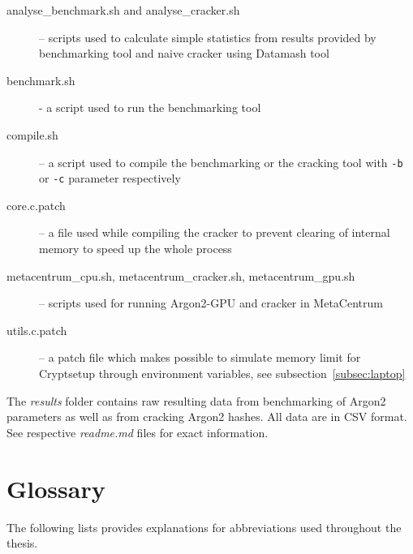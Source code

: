 \documentclass[nolof,digital]{fithesis3}
\begin{document}
\begin{description}
\item[analyse\_benchmark.sh and analyse\_cracker.sh] -- scripts used to calculate simple statistics from results provided by benchmarking tool and naive cracker using Datamash tool

\item[benchmark.sh]  - a script used to run the benchmarking tool

\item[compile.sh] -- a script used to compile the benchmarking or the cracking tool with \verb+-b+ or \verb+-c+ parameter respectively

\item[core.c.patch] -- a file used while compiling the cracker to prevent clearing of internal memory to speed up the whole process

\item[metacentrum\_cpu.sh, metacentrum\_cracker.sh, metacentrum\_gpu.sh] -- scripts used for running Argon2-GPU and cracker in MetaCentrum

\item[utils.c.patch] -- a patch file which makes possible to simulate memory limit for Cryptsetup through environment variables, see subsection~\ref{subsec:laptop}
\end{description}

The \emph{results} folder contains raw resulting data from benchmarking of Argon2 parameters as well as from cracking Argon2 hashes. All data are in CSV format. See respective \emph{readme.md} files for exact information.

\chapter{Glossary}
The following lists provides explanations for abbreviations used throughout the thesis.
\end{document}
